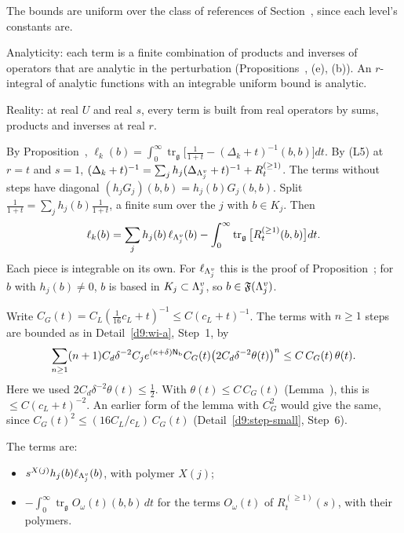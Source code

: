 \begin{detail}
\begin{step}
The bounds are uniform over the class of references of Section~, since each level's constants are.

Analyticity: each term is a finite combination of products and inverses of operators that are analytic in the perturbation (Propositions~, (e), (b)). An $r$-integral of analytic functions with an integrable uniform bound is analytic.

Reality: at real $U$ and real $s$, every term is built from real operators by sums, products and inverses at real $r$.
\end{step}
\begin{step}
By Proposition~, $\ell_k(b)=\int_0^\infty\operatorname{tr}_{\mathfrak g}\big[\frac1{1+t}-(\Delta_k+t)^{-1}(b,b)\big]dt$. By (L5) at $r=t$ and $s=1$, $(\Delta_k+t)^{-1}=\sum_jh_j(\Delta_{\Lambda^v_j}+t)^{-1}+R^{(\ge1)}_t$. The terms without steps have diagonal $(h_jG_j)(b,b)=h_j(b)G_j(b,b)$. Split $\frac1{1+t}=\sum_jh_j(b)\frac1{1+t}$, a finite sum over the $j$ with $b\in K_j$. Then
\[
\ell_k(b)=\sum_jh_j(b)\,\ell_{\Lambda^v_j}(b)-\int_0^\infty\operatorname{tr}_{\mathfrak g}\big[R^{(\ge1)}_t(b,b)\big]dt .
\]
Each piece is integrable on its own. For $\ell_{\Lambda^v_j}$ this is the proof of Proposition~; for $b$ with $h_j(b)\ne0$, $b$ is based in $K_j\subset\Lambda^v_j$, so $b\in\mathfrak F(\Lambda^v_j)$.
\end{step}
\begin{step}
Write $C_G(t)=C_L(\frac1{16}c_L+t)^{-1}\le C(c_L+t)^{-1}$. The terms with $n\ge1$ steps are bounded as in Detail~\ref{d9:wi-a}, Step~1, by
\[
\sum_{n\ge1}(n+1)C_d\delta^{-2}C_je^{(\kappa+\delta)\mathsf N_{\rm b}}C_G(t)\big(2C_d\delta^{-2}\theta(t)\big)^n\le C\,C_G(t)\,\theta(t) .
\]
Here we used $2C_d\delta^{-2}\theta(t)\le\frac12$. With $\theta(t)\le C\,C_G(t)$ (Lemma~), this is $\le C(c_L+t)^{-2}$. An earlier form of the lemma with $C_G^2$ would give the same, since $C_G(t)^2\le(16C_L/c_L)\,C_G(t)$ (Detail~\ref{d9:step-small}, Step~6).
\end{step}
\begin{step}
The terms are:
\begin{itemize}
\item $s^{X(j)}h_j(b)\ell_{\Lambda^v_j}(b)$, with polymer $X(j)$;
\item $-\int_0^\infty\operatorname{tr}_{\mathfrak g}O_\omega(t)(b,b)\,dt$ for the terms $O_\omega(t)$ of $R^{(\ge1)}_t(s)$, with their polymers.

\end{itemize}
\end{step}
\end{detail}
